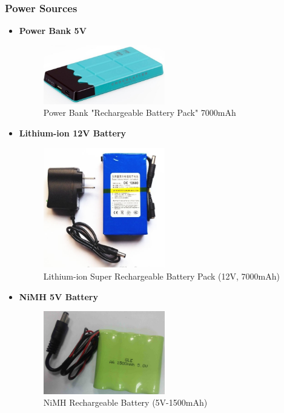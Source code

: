 \documentclass[12pt]{article}
\begin{document}
\subsubsection{Power Sources}
\begin{itemize}

	\item \textbf{Power Bank 5V}\\
	\begin{figure}[H]
		\centering
		\includegraphics[width =0.5\textwidth]{Fig/Electronics/power-bank.jpg}
		\caption{Power Bank "Rechargeable Battery Pack" 7000mAh}
		\label{fig:powerbank}
	\end{figure}

	\item \textbf{Lithium-ion 12V Battery}\\
	\begin{figure}[H]
		\centering
		\includegraphics[width =0.5\textwidth]{Fig/Electronics/bat12.jpg}
		\caption{Lithium-ion Super Rechargeable Battery Pack (12V, 7000mAh)}
		\label{fig:bat12}
	\end{figure}
	
		\item \textbf{NiMH 5V Battery}\\
	\begin{figure}[H]
		\centering
		\includegraphics[width =0.5\textwidth]{Fig/Electronics/bat5.jpg}
		\caption{NiMH Rechargeable Battery (5V-1500mAh)}
		\label{fig:bat5}
	\end{figure}
	
\end{itemize}
\end{document}
